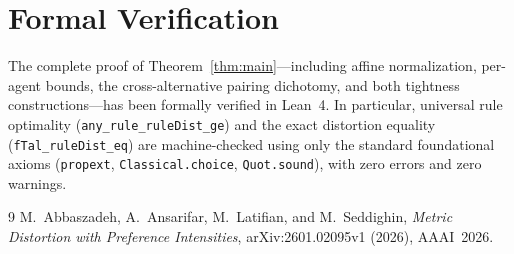 \documentclass[11pt]{article}
\begin{document}
\section{Formal Verification}

The complete proof of Theorem~\ref{thm:main}---including affine normalization,
per-agent bounds, the cross-alternative pairing dichotomy, and both tightness
constructions---has been formally verified in Lean~4. In particular, universal
rule optimality (\texttt{any\_rule\_ruleDist\_ge}) and the exact distortion
equality (\texttt{fTal\_ruleDist\_eq}) are machine-checked using only the
standard foundational axioms (\texttt{propext}, \texttt{Classical.choice},
\texttt{Quot.sound}), with zero errors and zero warnings.

\begin{thebibliography}{9}
M.~Abbaszadeh, A.~Ansarifar, M.~Latifian, and M.~Seddighin,
\emph{Metric Distortion with Preference Intensities},
arXiv:2601.02095v1 (2026), AAAI~2026.
\end{thebibliography}
\end{document}
